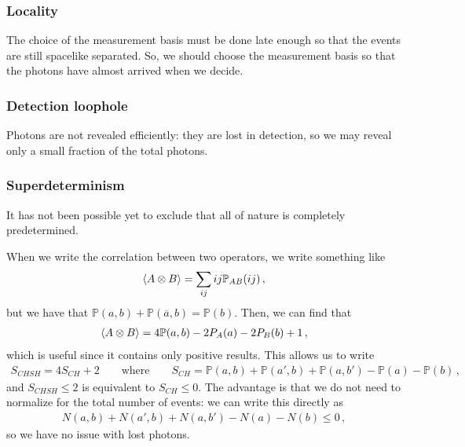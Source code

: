 \documentclass[main.tex]{subfiles}
\begin{document}
\subsubsection{Locality}

The choice of the measurement basis must be done late enough so that the events are still spacelike separated. 
So, we should choose the measurement basis so that the photons have almost arrived when we decide. 

\subsubsection{Detection loophole}

Photons are not revealed efficiently: they are lost in detection, so we may reveal only a small fraction of the total photons. 

\subsubsection{Superdeterminism}

It has not been possible yet to exclude that all of nature is completely predetermined. 

When we write the correlation between two operators, we write something like 
%
\begin{align}
\expval{A \otimes B} = \sum _{ij} ij \mathbb{P}_{AB} (ij)
\,,
\end{align}
%
but we have that \(\mathbb{P} (a, b) + \mathbb{P} (\overline{a}, b) = \mathbb{P}(b)\). 
Then, we can find that 
%
\begin{align}
\expval{A \otimes B} = 4 \mathbb{P}(a, b) - 2 P_A(a) -2 P_B(b) +1
\,,
\end{align}
%
which is useful since it contains only positive results. 
This allows us to write 
%
\begin{align}
S_{CHSH} = 4S_{CH} + 2
\qquad \text{where} \qquad
S_{CH} = \mathbb{P}(a, b) 
+ \mathbb{P} (a', b) 
+ \mathbb{P} (a, b') 
- \mathbb{P}(a) - \mathbb{P}(b)
\,,
\end{align}
%
and \(S_{CHSH}\leq 2\) is equivalent to \(S_{CH} \leq 0\). The advantage is that we do not need to normalize for the total number of events: we can write this directly as 
%
\begin{align}
N(a, b) 
+ N (a', b) 
+ N (a, b') 
- N(a) - N(b)
\leq 0
\,,
\end{align}
%
so we have no issue with lost photons. 
\end{document}
